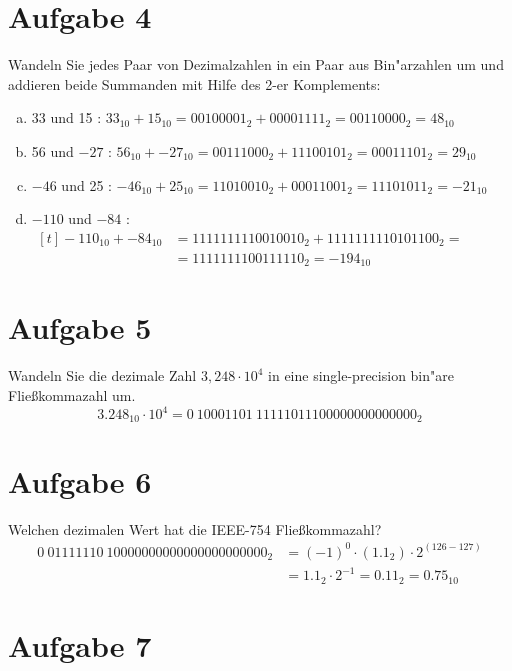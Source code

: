 \documentclass[10pt, oneside]{article}
\begin{document}
\section{Aufgabe 4}

Wandeln Sie jedes Paar von Dezimalzahlen in ein Paar aus Bin"arzahlen um und
addieren beide Summanden mit Hilfe des 2-er Komplements:
\begin{enumerate}[(a)]
    \item 33 und 15 : $33_{10} + 15_{10} = 00100001_2 + 00001111_2 = 00110000_2 = 48_{10}$
    \item 56 und $-27$ : $56_{10} + -27_{10} = 00111000_2 + 11100101_2 = 00011101_2 = 29_{10}$
    \item $-46$ und 25 : $-46_{10} + 25_{10} = 11010010_2 + 00011001_2 = 11101011_2 = -21_{10}$
    \item $-110$ und $-84$ : $\begin{aligned}[t]-110_{10} + -84_{10} &= 1111111110010010_2 + 1111111110101100_2 =\\&= 1111111100111110_2 = -194_{10}\end{aligned}$
\end{enumerate}

\section{Aufgabe 5}

Wandeln Sie die dezimale Zahl $3,248 \cdot 10^4$ in eine single-precision
bin"are Flie{\ss}kommazahl um.
\begin{equation*}
    3.248_{10} \cdot 10^{4} = 0\ 10001101\ 11111011100000000000000_2
\end{equation*}

\section{Aufgabe 6}

Welchen dezimalen Wert hat die IEEE-754 Flie{\ss}kommazahl?
\begin{align*}
    0\ 01111110\ 10000000000000000000000_2 &= (-1)^0 \cdot (1.1_2) \cdot 2^{(126 - 127)} \\
                                           &= 1.1_2 \cdot 2^{-1} = 0.11_2 = 0.75_{10}
\end{align*}

\section{Aufgabe 7}
\end{document}
